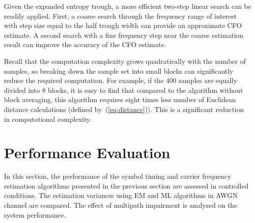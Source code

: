 \documentclass[12pt, draftclsnofoot, onecolumn]{IEEEtran}
\begin{document}
Given the expanded entropy trough, a more efficient two-step linear search can be readily applied.
First, a coarse search through the frequency range of interest with step size equal to the half trough width can provide an approximate CFO estimate.
A second search with a fine frequency step near the coarse estimation result can improve the accuracy of the CFO estimate.

Recall that the computation complexity grows quadratically with the number of samples, so breaking down the sample set into small blocks can significantly reduce the required computation.
For example, if the 400 samples are equally divided into 8 blocks, it is easy to find that compared to the algorithm without block averaging, 
this algorithm requires eight times less number of Euclidean distance calculations (defined by~(\ref{eq:distance})). 
This is a significant reduction in computational complexity. 




\section{Performance Evaluation}
\label{sec:perfo}
In this section, the performance of the symbol timing and carrier frequency estimation algorithms presented in the previous section are assessed in controlled conditions.
The estimation variances using EM and ML algorithms in AWGN channel are compared.
The effect of multipath impairment is analyzed on the system performance.
\end{document}
